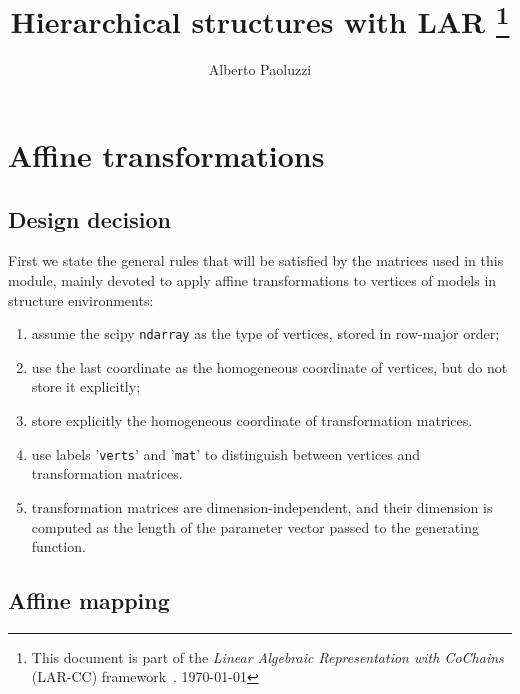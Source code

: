 \documentclass[11pt,oneside]{article}    %
\title{Hierarchical structures with LAR
\footnote{This document is part of the \emph{Linear Algebraic Representation with CoChains} (LAR-CC) framework~\cite{cclar-proj:2013:00}. \today}
}
\author{Alberto Paoluzzi}
\begin{document}
\maketitle
\nonstopmode

\tableofcontents



\section{Affine transformations}
\subsection{Design decision}
First we state the general rules that will be satisfied by the matrices used in this module, mainly devoted to apply affine transformations to vertices of models in structure environments:
\begin{enumerate}
\item assume the scipy \texttt{ndarray} as the type of vertices, stored in row-major order;
\item use the last coordinate as the homogeneous coordinate of vertices, but do not store it explicitly;
\item store explicitly the homogeneous coordinate of transformation matrices.
\item use labels '\texttt{verts}' and '\texttt{mat}' to distinguish between vertices and transformation matrices.
\item transformation matrices are dimension-independent, and their dimension is computed as the length of the parameter vector passed to the generating function.
\end{enumerate}


\subsection{Affine mapping}
\end{document}
